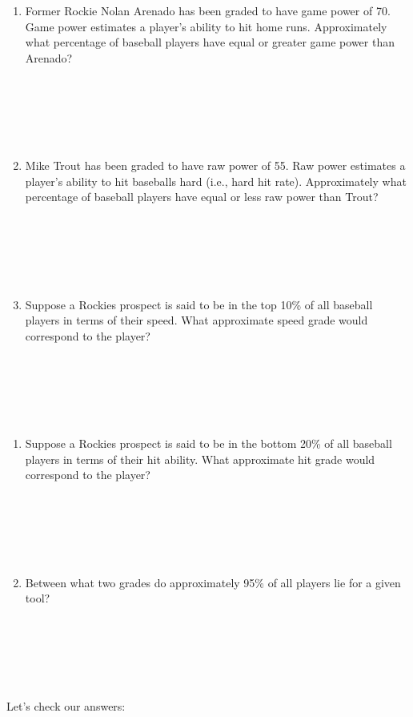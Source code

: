\documentclass[
  11pt,
]{book}
\theoremstyle{definition}
\theoremstyle{definition}
\theoremstyle{definition}
\theoremstyle{definition}
\theoremstyle{remark}
\begin{document}
\begin{enumerate}
\def\labelenumi{(\alph{enumi})}
\item
  Former Rockie Nolan Arenado has been graded to have game power of 70. Game power estimates a player's ability to hit home runs. Approximately what percentage of baseball players have equal or greater game power than Arenado?\\
  \strut \\
  \strut \\
  \strut \\
  \vfill
\item
  Mike Trout has been graded to have raw power of 55. Raw power estimates a player's ability to hit baseballs hard (i.e., hard hit rate). Approximately what percentage of baseball players have equal or less raw power than Trout?\\
  \strut \\
  \strut \\
  \strut \\
  \vfill
\item
  Suppose a Rockies prospect is said to be in the top 10\% of all baseball players in terms of their speed. What approximate speed grade would correspond to the player?\\
  \strut \\
  \strut \\
  \strut \\
  \vfill
\end{enumerate}

\newpage

\begin{enumerate}
\def\labelenumi{(\alph{enumi})}
\setcounter{enumi}{3}
\item
  Suppose a Rockies prospect is said to be in the bottom 20\% of all baseball players in terms of their hit ability. What approximate hit grade would correspond to the player?\\
  \strut \\
  \strut \\
  \strut \\
  \vfill
\item
  Between what two grades do approximately 95\% of all players lie for a given tool?\\
  \strut \\
  \strut \\
  \strut \\
  \vfill
\end{enumerate}

Let's check our answers:
\end{document}
